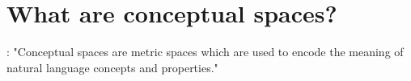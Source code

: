 \section{What are conceptual spaces? }

\cite{Derrac2015}: "Conceptual spaces \cite{Gardenfors2000} are metric spaces which are used to encode the meaning of natural language concepts and properties." %






